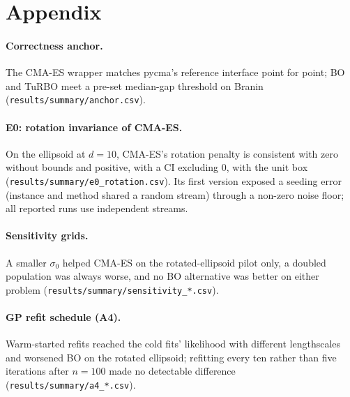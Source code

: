 \documentclass[10pt,a4paper,twocolumn]{article}
\begin{document}



\appendix
\section{Appendix}
\label{sec:appendix}
\paragraph{Correctness anchor.}
The CMA-ES wrapper matches pycma's reference interface point for point; BO and TuRBO meet a pre-set median-gap
threshold on Branin (\texttt{results/summary/anchor.csv}).

\paragraph{E0: rotation invariance of CMA-ES.}
On the ellipsoid at $d=10$, CMA-ES's rotation penalty is consistent with zero without bounds and positive, with a CI
excluding 0, with the unit box (\texttt{results/summary/e0\_rotation.csv}). Its first version exposed a seeding error (instance
and method shared a random stream) through a non-zero noise floor; all reported runs use independent streams.

\paragraph{Sensitivity grids.}
A smaller $\sigma_0$ helped CMA-ES on the rotated-ellipsoid pilot only, a doubled population was always worse, and no BO
alternative was better on either problem (\texttt{results/summary/sensitivity\_*.csv}).

\paragraph{GP refit schedule (A4).}
Warm-started refits reached the cold fits' likelihood with different lengthscales and worsened BO on the rotated
ellipsoid; refitting every ten rather than five iterations after $n=100$ made no detectable difference
(\texttt{results/summary/a4\_*.csv}).
\end{document}
